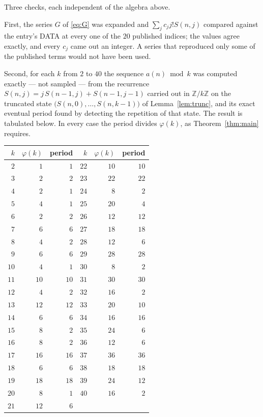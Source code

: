 \documentclass[11pt,a4paper]{article}
\theoremstyle{plain}
\theoremstyle{definition}
\begin{document}
Three checks, each independent of the algebra above.

First, the series $G$ of \eqref{eq:G} was expanded and $\sum_j c_j j! S(n,j)$ compared
against the entry's DATA at every one of the $20$ published indices; the values
agree exactly, and every $c_j$ came out an integer. A series that reproduced only some of
the published terms would not have been used.

Second, for each $k$ from $2$ to $40$ the sequence $a(n)\bmod k$ was computed exactly
--- not sampled --- from the recurrence $S(n,j)=j\,S(n-1,j)+S(n-1,j-1)$ carried out in
$\mathbb{Z}/k\mathbb{Z}$ on the truncated state
$\bigl(S(n,0),\dots,S(n,k-1)\bigr)$ of Lemma~\ref{lem:trunc}, and its exact eventual
period found by detecting the repetition of that state. The result is tabulated below.
In every case the period divides $\varphi(k)$, as Theorem~\ref{thm:main} requires.

\begin{center}\small
\begin{tabular}{rrr@{\qquad\qquad}rrr}
$k$ & $\varphi(k)$ & period & $k$ & $\varphi(k)$ & period \\ \hline
$2$ & $1$ & $1$ & $22$ & $10$ & $10$ \\
$3$ & $2$ & $2$ & $23$ & $22$ & $22$ \\
$4$ & $2$ & $1$ & $24$ & $8$ & $2$ \\
$5$ & $4$ & $1$ & $25$ & $20$ & $4$ \\
$6$ & $2$ & $2$ & $26$ & $12$ & $12$ \\
$7$ & $6$ & $6$ & $27$ & $18$ & $18$ \\
$8$ & $4$ & $2$ & $28$ & $12$ & $6$ \\
$9$ & $6$ & $6$ & $29$ & $28$ & $28$ \\
$10$ & $4$ & $1$ & $30$ & $8$ & $2$ \\
$11$ & $10$ & $10$ & $31$ & $30$ & $30$ \\
$12$ & $4$ & $2$ & $32$ & $16$ & $2$ \\
$13$ & $12$ & $12$ & $33$ & $20$ & $10$ \\
$14$ & $6$ & $6$ & $34$ & $16$ & $16$ \\
$15$ & $8$ & $2$ & $35$ & $24$ & $6$ \\
$16$ & $8$ & $2$ & $36$ & $12$ & $6$ \\
$17$ & $16$ & $16$ & $37$ & $36$ & $36$ \\
$18$ & $6$ & $6$ & $38$ & $18$ & $18$ \\
$19$ & $18$ & $18$ & $39$ & $24$ & $12$ \\
$20$ & $8$ & $1$ & $40$ & $16$ & $2$ \\
$21$ & $12$ & $6$ &  & & \\
\end{tabular}
\end{center}
\end{document}
